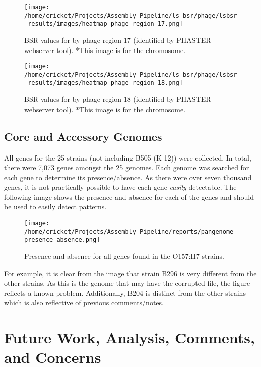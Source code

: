 \documentclass[11pt]{article}
\begin{document}
\begin{figure}[ht!]\normalsize %
\centering
\texttt{[image: /home/cricket/Projects/Assembly\_Pipeline/ls\_bsr/phage/lsbsr\_results/images/heatmap\_phage\_region\_17.png]} 
\caption{BSR values for by phage region 17 (identified by PHASTER webserver tool). *This image is for the chromosome.}
\label{phage_17}
\end{figure}

\clearpage

\begin{figure}[ht!]\normalsize %
\centering
\texttt{[image: /home/cricket/Projects/Assembly\_Pipeline/ls\_bsr/phage/lsbsr\_results/images/heatmap\_phage\_region\_18.png]} 
\caption{BSR values for by phage region 18 (identified by PHASTER webserver tool). *This image is for the chromosome.}
\label{phage_18}
\end{figure}
\clearpage

\subsection*{Core and Accessory Genomes}
All genes for the 25 strains (not including B505 (K-12)) were collected. In total, there were 7,073 genes amongst the 25 genomes. Each genome was searched for each gene to determine its presence/absence. As there were over seven thousand genes, it is not practically possible to have each gene \textit{easily} detectable. The following image shows the presence and absence for each of the genes and should be used to easily detect patterns.  

\begin{figure}[ht!]\normalsize %
\centering
\texttt{[image: /home/cricket/Projects/Assembly\_Pipeline/reports/pangenome\_presence\_absence.png]}
\caption{Presence and absence for all genes found in the O157:H7 strains.}
\label{presence_absence}
\end{figure}

For example, it is clear from the image that strain B296 is very different from the other strains. As this is the genome that may have the corrupted file, the figure reflects a known problem. Additionally, B204 is distinct from the other strains --- which is also reflective of previous comments/notes.


\section*{Future Work, Analysis, Comments, and Concerns}
\end{document}
